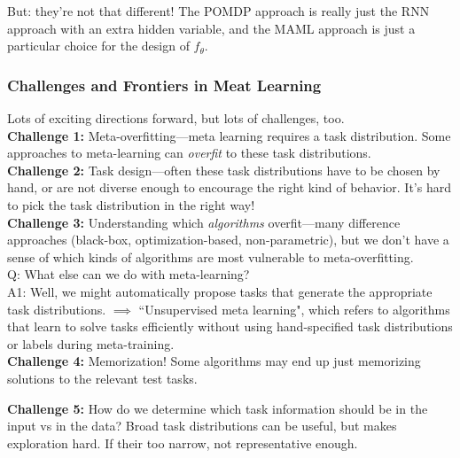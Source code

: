 But: they're not that different! The POMDP approach is really just the RNN approach with an extra hidden variable, and the MAML approach is just a particular choice for the design of $f_\theta$. \\

\subsubsection{Challenges and Frontiers in Meat Learning}

Lots of exciting directions forward, but lots of challenges, too. \\

{\bf Challenge 1:} Meta-overfitting---meta learning requires a task distribution. Some approaches to meta-learning can {\it overfit} to these task distributions.\\

{\bf Challenge 2:} Task design---often these task distributions have to be chosen by hand, or are not diverse enough to encourage the right kind of behavior. It's hard to pick the task distribution in the right way! \\

{\bf Challenge 3:} Understanding which {\it algorithms} overfit---many difference approaches (black-box, optimization-based, non-parametric), but we don't have a sense of which kinds of algorithms are most vulnerable to meta-overfitting. \\

Q: What else can we do with meta-learning? \\

A1: Well, we might automatically propose tasks that generate the appropriate task distributions. $\implies$ ``Unsupervised meta learning", which refers to algorithms that learn to solve tasks efficiently without using hand-specified task distributions or labels during meta-training. \\

{\bf Challenge 4:} Memorization! Some algorithms may end up just memorizing solutions to the relevant test tasks.

{\bf Challenge 5:} How do we determine which task information should be in the input vs in the data? Broad task distributions can be useful, but makes exploration hard. If their too narrow, not representative enough. \\



\spacerule